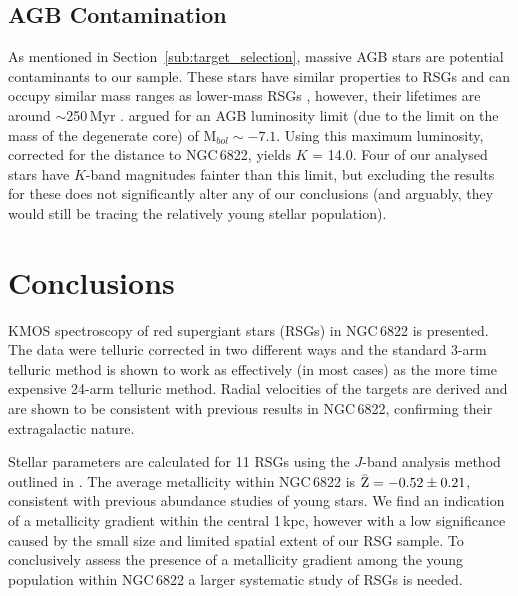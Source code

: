 
\subsection{AGB Contamination} %
\label{sub:AGB_contamination}
As mentioned in Section~\ref{sub:target_selection}, massive AGB stars are potential contaminants to our sample.
These stars have similar properties to RSGs and can occupy similar mass ranges as lower-mass RSGs
\citep{2005ARA&A..43..435H},
however, their lifetimes are around $\sim$250\,Myr
\citep{2010MNRAS.401.1453D}.
\cite{1983ApJ...272...99W} argued for an AGB luminosity limit
(due to the limit on the mass of the degenerate core) of M$_{bol}\sim-7.1$.
Using this maximum luminosity, corrected for the distance to NGC\,6822,
yields $K$ = 14.0.
Four of our analysed stars have $K$-band magnitudes fainter than this limit,
but excluding the results for these does not significantly alter any of our conclusions
(and arguably, they would still be tracing the relatively young stellar population).


\section{Conclusions} %
\label{sec:conclusions}

KMOS spectroscopy of red supergiant stars (RSGs) in NGC\,6822 is presented.
The data were telluric corrected in two different ways and the standard 3-arm telluric method is shown to work as effectively (in most cases) as the more time expensive 24-arm telluric method.
Radial velocities of the targets are derived and are shown to be consistent with previous results in NGC\,6822, confirming their extragalactic nature.

Stellar parameters are calculated for 11 RSGs using the $J$-band analysis method outlined in
\cite{2010MNRAS.407.1203D}.
The average metallicity within NGC\,6822 is
$\bar{\rm Z} = -0.52\pm 0.21$,
consistent with previous abundance studies of young stars.
We find an indication of a metallicity gradient within the central 1\,kpc,
however with a low significance caused by the small size and limited spatial extent of our RSG sample.
To conclusively assess the presence of a metallicity gradient among the young population within NGC\,6822 a larger systematic study of RSGs is needed.

